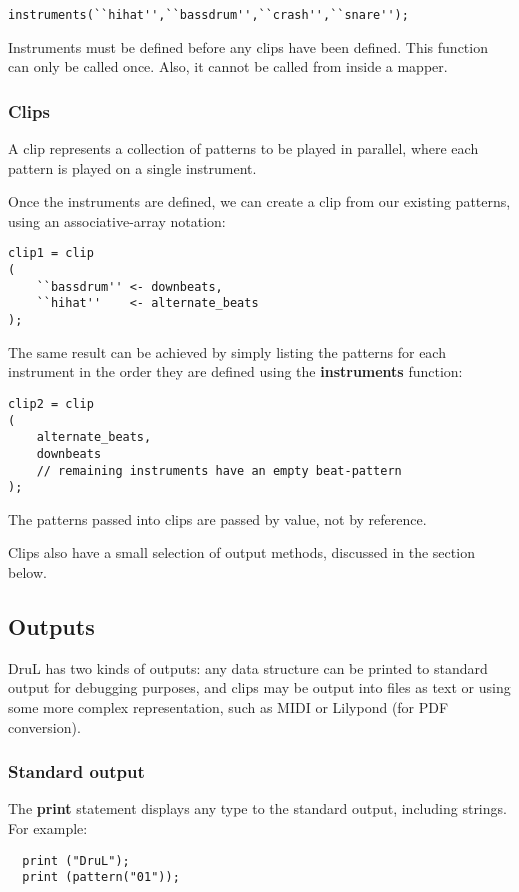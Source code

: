 \begin{verbatim}
instruments(``hihat'',``bassdrum'',``crash'',``snare'');
\end{verbatim}

Instruments must be defined before any clips have been defined. This function 
can only be called once. Also, it cannot be called from inside a mapper.

\subsubsection{Clips}

A clip represents a collection of patterns to be played in parallel, where each pattern is played on a single instrument.

Once the instruments are defined, we can create a clip from our existing patterns, using an
associative-array notation:

\begin{verbatim}
clip1 = clip
(
    ``bassdrum'' <- downbeats,
    ``hihat''    <- alternate_beats
);
\end{verbatim}
The same result can be achieved by simply listing the patterns for each instrument in the order they are defined using the \textbf{instruments} function:
\begin{verbatim}
clip2 = clip
(
    alternate_beats,
    downbeats
    // remaining instruments have an empty beat-pattern
);

\end{verbatim}
The patterns passed into clips are passed by value, not by reference.


Clips also have a small selection of output methods, discussed in the section below.


\subsection{Outputs}

DruL has two kinds of outputs: any data structure can be printed to standard output for debugging purposes, and clips may be output into files as text or using some
more complex representation, such as MIDI or Lilypond (for PDF conversion).

\subsubsection{Standard output}

The \textbf{print} statement displays any type to the standard
output, including strings. For example:
\begin{verbatim}
  print ("DruL");
  print (pattern("01"));
\end{verbatim}

